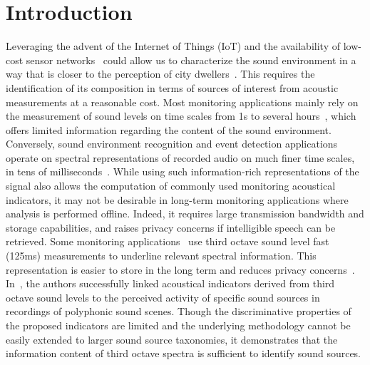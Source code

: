 \documentclass[twocolumn]{article}
\begin{document}
\section{Introduction}
\label{sec:intro}


Leveraging the advent of the Internet of Things (IoT) and the availability of low-cost sensor networks~\cite{ardouin2018, mydlarz2017} could allow us to characterize the sound environment in a way that is closer to the perception of city dwellers~\cite{iso2014}. This requires the identification of its composition in terms of sources of interest from acoustic measurements at a reasonable cost. Most monitoring applications mainly rely on the measurement of sound levels on time scales from 1s to several hours~\cite{can2008, brocolini2013}, which offers limited information regarding the content of the sound environment. Conversely, sound environment recognition and event detection applications operate on spectral representations of recorded audio on much finer time scales, in tens of milliseconds~\cite{lunden2016, aucouturier2007, cakir2015}. While using such information-rich representations of the signal also allows the computation of commonly used monitoring acoustical indicators, it may not be desirable in long-term monitoring applications where analysis is performed offline. Indeed, it requires large transmission bandwidth and storage capabilities, and raises privacy concerns if intelligible speech can be retrieved. Some monitoring applications~\cite{aumond2017, torija2013, nilsson2007} use third octave sound level fast (125ms) measurements to underline relevant spectral information. This representation is easier to store in the long term and reduces privacy concerns~\cite{gontier2017}. In~\cite{aumond2017}, the authors successfully linked acoustical indicators derived from third octave sound levels to the perceived activity of specific sound sources in recordings of polyphonic sound scenes. Though the discriminative properties of the proposed indicators are limited and the underlying methodology cannot be easily extended to larger sound source taxonomies, it demonstrates that the information content of third octave spectra is sufficient to identify sound sources.
\end{document}
